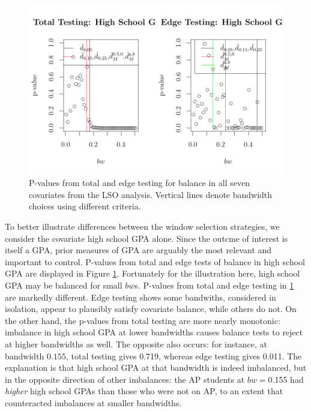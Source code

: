 \documentclass[12pt]{article}\usepackage[]{graphicx}\usepackage[]{color}
\makeatletter
\def\maxwidth{ %
  \ifdim\Gin@nat@width>\linewidth
    \linewidth
  \else
    \Gin@nat@width
  \fi
}
\newenvironment{knitrout}{}{} %
\makeatother
\begin{document}
\begin{figure}
\begin{knitrout}
\color{fgcolor}
\includegraphics[width=\maxwidth]{figure/rdd2-1} 

\end{knitrout}
\caption{P-values from total and edge testing for balance in all seven covariates
  from the LSO analysis. Vertical lines denote bandwidth choices using
  different criteria.}
\label{fig:rdpvalues2}
\end{figure}


To better illustrate differences between the window selection
strategies, we consider the covariate high school GPA alone.
Since the outcme of interest is itself a GPA, prior measures of GPA
are arguably the most relevant and important to control.
P-values from total and edge tests of balance in high school GPA are
displayed in Figure \ref{fig:rdpvalues2}.
Fortunately for the illustration here, high school GPA may be
balanced for small $bw$s.
P-values from total and edge testing in \ref{fig:rdpvalues2} are
markedly different.
Edge testing shows some bandwiths, considered in
isolation, appear to plausibly satisfy covariate balance, while others do not.
On the other hand, the p-values from total testing are more nearly
monotonic: imbalance in high school GPA at lower bandwidths causes
balance tests to reject at higher bandwidths as well.
The opposite also occurs: for instance, at bandwidth
$0.155$, total testing gives 0.719,
whereas edge testing gives 0.011.
The explanation is that high school GPA at that bandwidth is indeed
imbalanced, but in the opposite direction of other imbalances: the AP
students at $bw=$0.155 had \emph{higher} high school GPAs
than those who were not on AP, to an extent that counteracted
imbalances at smaller bandwidths.
\end{document}

